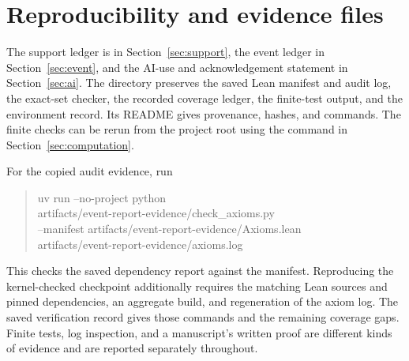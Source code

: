 \documentclass[11pt]{article}
\theoremstyle{definition}\newtheorem{definition}[theorem]{Definition}
\theoremstyle{remark}\newtheorem{remark}[theorem]{Remark}
\begin{document}
\section{Reproducibility and evidence files}\label{app:verification}
The support ledger is in Section~\ref{sec:support}, the event ledger in Section~\ref{sec:event}, and the AI-use and acknowledgement statement in Section~\ref{sec:ai}. The directory  preserves the saved Lean manifest and audit log, the exact-set checker, the recorded coverage ledger, the finite-test output, and the environment record. Its README gives provenance, hashes, and commands. The finite checks can be rerun from the project root using the command in Section~\ref{sec:computation}.

For the copied audit evidence, run
\begin{quote}\small\ttfamily
uv run --no-project python\\
artifacts/event-report-evidence/check\_axioms.py\\
--manifest artifacts/event-report-evidence/Axioms.lean\\
artifacts/event-report-evidence/axioms.log
\end{quote}
This checks the saved dependency report against the manifest. Reproducing the kernel-checked checkpoint additionally requires the matching Lean sources and pinned dependencies, an aggregate build, and regeneration of the axiom log. The saved verification record gives those commands and the remaining coverage gaps. Finite tests, log inspection, and a manuscript's written proof are different kinds of evidence and are reported separately throughout.
\end{document}
